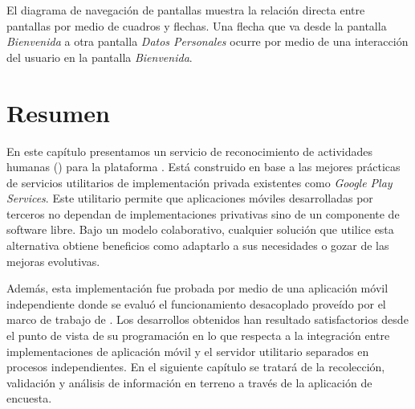 El diagrama de navegación de pantallas muestra la relación directa
entre pantallas por medio de cuadros y flechas. Una flecha que va
desde la pantalla \emph{Bienvenida} a otra pantalla \emph{Datos Personales}
ocurre por medio de una interacción del usuario en la pantalla \emph{Bienvenida}. 

\section{Resumen}

\label{sec56:conclusion}En este capítulo presentamos un servicio
de reconocimiento de actividades humanas () para la plataforma
\emph{}. Está construido en base a las mejores prácticas
de servicios utilitarios de implementación privada existentes como\emph{
Google Play Services}. Este utilitario permite que aplicaciones móviles
desarrolladas por terceros no dependan de implementaciones privativas
sino de un componente de software libre. Bajo un modelo colaborativo,
cualquier solución que utilice esta alternativa obtiene beneficios
como adaptarlo a sus necesidades o gozar de las mejoras evolutivas. 

Además, esta implementación fue probada por medio de una aplicación
móvil independiente donde se evaluó el funcionamiento desacoplado
proveído por el marco de trabajo de \emph{}. Los desarrollos
obtenidos han resultado satisfactorios desde el punto de vista de
su programación en lo que respecta a la integración entre implementaciones
de aplicación móvil y el servidor utilitario separados en procesos
independientes. En el siguiente capítulo se tratará de la recolección,
validación y análisis de información en terreno a través de la aplicación
de encuesta.
